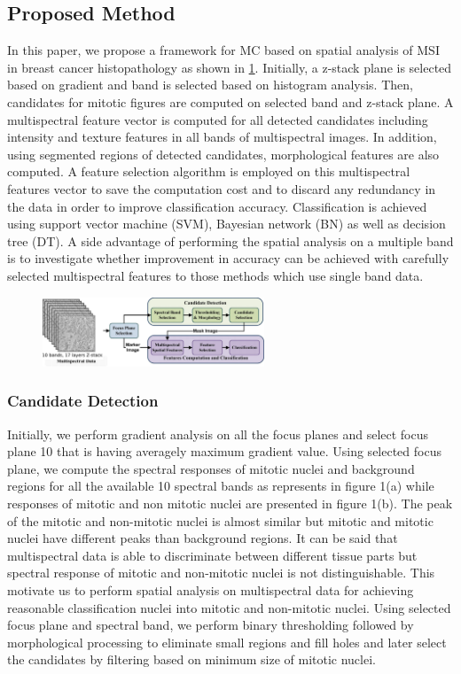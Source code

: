 \documentclass[10pt,twocolumn,letterpaper]{article}
\begin{document}
\subsection{Proposed Method}
In this paper, we propose a framework for MC based on spatial analysis of MSI in breast cancer histopathology as shown in \ref{fig:framework}. Initially, a z-stack plane is selected based on gradient and band is selected based on histogram analysis. Then, candidates for mitotic figures  are computed on selected band and z-stack plane. A multispectral feature vector is computed for all detected candidates including intensity and texture features in all bands of multispectral images. In addition, using segmented regions of detected candidates, morphological features are also computed. A feature selection algorithm is employed on this multispectral features vector to save the computation cost and to discard any redundancy in the data in order to improve classification accuracy. Classification is achieved using support vector machine (SVM), Bayesian network (BN) as well as decision tree (DT). A side advantage of performing the spatial analysis on a multiple band is to investigate whether improvement in accuracy can be achieved with carefully selected multispectral features to those methods \cite{masood2009,wu2009,wu2012} which use single band data.
\begin{figure}[t]
	\centering
	\includegraphics[width=250px]{diagrams/framework.jpg}
	\label{fig:framework}
\end{figure}

\subsubsection{Candidate Detection}
Initially, we perform gradient analysis on all the focus planes and select focus plane 10 that is having averagely maximum gradient value. Using selected focus plane, we compute the spectral responses of mitotic nuclei and background regions for all the available 10 spectral bands as represents in figure 1(a) while responses of mitotic and non mitotic nuclei are presented in figure 1(b). The peak of the mitotic and non-mitotic nuclei is almost similar but mitotic and mitotic nuclei have different peaks than background regions. It can be said that multispectral data is able to discriminate between different tissue parts but spectral response of mitotic and non-mitotic nuclei is not distinguishable. This motivate us to perform spatial analysis on multispectral data for achieving reasonable classification nuclei into mitotic and non-mitotic nuclei. Using selected focus plane and spectral band, we perform binary thresholding followed by morphological processing to eliminate small regions and fill holes and later select the candidates by filtering based on minimum size of mitotic nuclei. 
\end{document}
